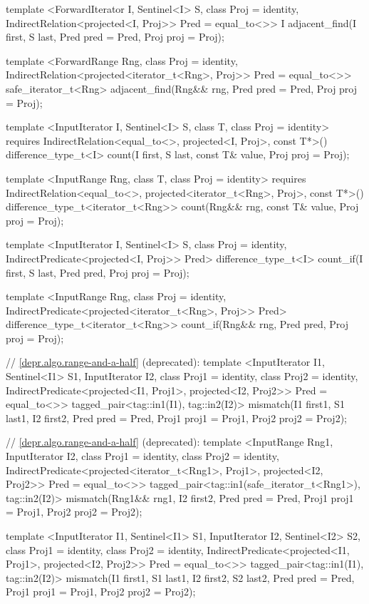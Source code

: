 \begin{codeblock}
{{{{  template <ForwardIterator I, Sentinel<I> S, class Proj = identity,
      IndirectRelation<projected<I, Proj>> Pred = equal_to<>>
    I
      adjacent_find(I first, S last, Pred pred = Pred{},
                    Proj proj = Proj{});

  template <ForwardRange Rng, class Proj = identity,
      IndirectRelation<projected<iterator_t<Rng>, Proj>> Pred = equal_to<>>
    safe_iterator_t<Rng>
      adjacent_find(Rng&& rng, Pred pred = Pred{}, Proj proj = Proj{});

  template <InputIterator I, Sentinel<I> S, class T, class Proj = identity>
    requires IndirectRelation<equal_to<>, projected<I, Proj>, const T*>()
    difference_type_t<I>
      count(I first, S last, const T& value, Proj proj = Proj{});

  template <InputRange Rng, class T, class Proj = identity>
    requires IndirectRelation<equal_to<>, projected<iterator_t<Rng>, Proj>, const T*>()
    difference_type_t<iterator_t<Rng>>
      count(Rng&& rng, const T& value, Proj proj = Proj{});

  template <InputIterator I, Sentinel<I> S, class Proj = identity,
      IndirectPredicate<projected<I, Proj>> Pred>
    difference_type_t<I>
      count_if(I first, S last, Pred pred, Proj proj = Proj{});

  template <InputRange Rng, class Proj = identity,
      IndirectPredicate<projected<iterator_t<Rng>, Proj>> Pred>
    difference_type_t<iterator_t<Rng>>
      count_if(Rng&& rng, Pred pred, Proj proj = Proj{});

  // \ref{depr.algo.range-and-a-half} (deprecated):
  template <InputIterator I1, Sentinel<I1> S1, InputIterator I2,
      class Proj1 = identity, class Proj2 = identity,
      IndirectPredicate<projected<I1, Proj1>, projected<I2, Proj2>> Pred = equal_to<>>
    tagged_pair<tag::in1(I1), tag::in2(I2)>
      mismatch(I1 first1, S1 last1, I2 first2, Pred pred = Pred{},
               Proj1 proj1 = Proj1{}, Proj2 proj2 = Proj2{});

  // \ref{depr.algo.range-and-a-half} (deprecated):
  template <InputRange Rng1, InputIterator I2,
      class Proj1 = identity, class Proj2 = identity,
      IndirectPredicate<projected<iterator_t<Rng1>, Proj1>,
        projected<I2, Proj2>> Pred = equal_to<>>
    tagged_pair<tag::in1(safe_iterator_t<Rng1>), tag::in2(I2)>
      mismatch(Rng1&& rng1, I2 first2, Pred pred = Pred{},
               Proj1 proj1 = Proj1{}, Proj2 proj2 = Proj2{});

  template <InputIterator I1, Sentinel<I1> S1, InputIterator I2, Sentinel<I2> S2,
      class Proj1 = identity, class Proj2 = identity,
      IndirectPredicate<projected<I1, Proj1>, projected<I2, Proj2>> Pred = equal_to<>>
    tagged_pair<tag::in1(I1), tag::in2(I2)>
      mismatch(I1 first1, S1 last1, I2 first2, S2 last2, Pred pred = Pred{},
               Proj1 proj1 = Proj1{}, Proj2 proj2 = Proj2{});

}}}}
\end{codeblock}
